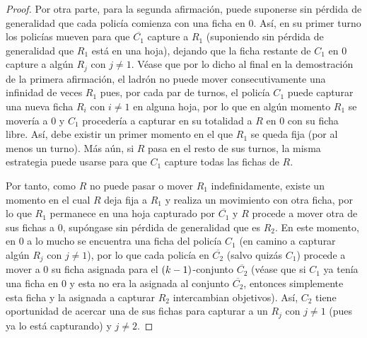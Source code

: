 \begin{proof}
    Por otra parte, para la segunda afirmaci\'on, puede suponerse sin p\'erdida
    de generalidad que cada polic\'ia comienza con una ficha en $0$. As\'i, en
    su primer turno los polic\'ias mueven para que $\overline{C_1}$ capture a
    $R_1$ (suponiendo sin p\'erdida de generalidad que $R_1$ est\'a en una
    hoja), dejando que la ficha restante de $C_1$ en $0$ capture a alg\'un $R_j$
    con $j\neq 1$. V\'ease que por lo dicho al final en la demostraci\'on de la
    primera afirmaci\'on, el ladr\'on no puede mover consecutivamente una
    infinidad de veces $R_1$ pues, por cada par de turnos, el polic\'ia $C_1$
    puede capturar una nueva ficha $R_i$ con $i\neq 1$ en alguna hoja, por lo
    que en alg\'un momento $R_1$ se mover\'ia a $0$ y $C_1$ proceder\'ia a
    capturar en su totalidad a $R$ en $0$ con su ficha libre. As\'i, debe
    existir un primer momento en el que $R_1$ se queda fija (por al menos un
    turno). M\'as a\'un, si $R$ pasa en el resto de sus turnos, la misma
    estrategia puede usarse para que $C_1$ capture todas las fichas de $R$.

    Por tanto, como $R$ no puede pasar o mover $R_1$ indefinidamente, existe un
    momento en el cual $R$ deja fija a $R_1$ y realiza un movimiento con otra
    ficha, por lo que $R_1$ permanece en una hoja capturado por $\overline{C_1}$
    y $R$ procede a mover otra de sus fichas a $0$, sup\'ongase sin p\'erdida de
    generalidad que es $R_2$. En este momento, en $0$ a lo mucho se encuentra
    una ficha del polic\'ia $C_1$ (en camino a capturar alg\'un $R_j$ con $j\neq
    1$), por lo que cada polic\'ia en $\overline{C_2}$ (salvo quiz\'as $C_1$)
    procede a mover a $0$ su ficha asignada para el $\left( k-1\right)$-conjunto
    $\overline{C_2}$ (v\'ease que si $C_1$ ya ten\'ia una ficha en $0$ y esta no
    era la asignada al conjunto $\overline{C_2}$, entonces simplemente esta
    ficha y la asignada a capturar $R_2$ intercambian objetivos). As\'i, $C_2$
    tiene oportunidad de acercar una de sus fichas para capturar a un $R_j$ con
    $j\neq 1$ (pues ya lo est\'a capturando) y $j\neq 2$.


\end{proof}
